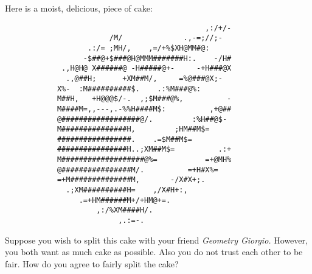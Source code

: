 \documentclass[noauthor,nooutcomes,hints,handout,12pt]{ximera}
\begin{document}
\begin{question}



  Here is a moist, delicious, piece of cake:
            
\begin{verbatim}
                                              ,:/+/-
                        /M/              .,-=;//;-
                   .:/= ;MH/,    ,=/+%$XH@MM#@:
                  -$##@+$###@H@MMM#######H:.    -/H#
             .,H@H@ X######@ -H#####@+-     -+H###@X
              .,@##H;      +XM##M/,     =%@###@X;-
            X%-  :M##########$.    .:%M###@%:
            M##H,   +H@@@$/-.  ,;$M###@%,          -
            M####M=,,---,.-%%H####M$:          ,+@##
            @##################@/.         :%H##@$-
            M###############H,         ;HM##M$=
            #################.    .=$M##M$=
            ################H..;XM##M$=          .:+
            M###################@%=           =+@MH%
            @################M/.          =+H#X%=
            =+M##############M,       -/X#X+;.
              .;XM##########H=    ,/X#H+:,
                 .=+HM######M+/+HM@+=.
                     ,:/%XM####H/.
                          ,.:=-.                    
\end{verbatim}

Suppose you wish to split this cake with your friend \textit{Geometry
  Giorgio.} However, you both want as much cake as possible. Also you
do not trust each other to be fair. How do you agree to fairly split
the cake?
\end{question}


\mynewpage
\end{document}
